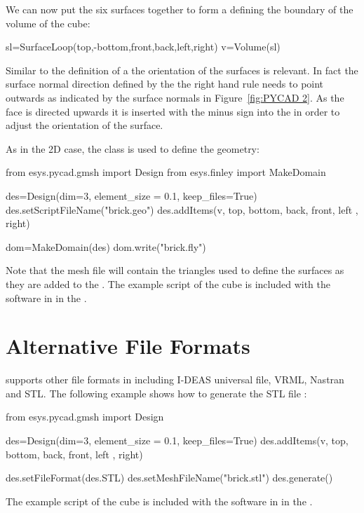 We can now put the six surfaces together to form a  defining the
boundary of the volume of the cube:
\begin{python}
sl=SurfaceLoop(top,-bottom,front,back,left,right)
v=Volume(sl)
\end{python}
Similar to the definition of a  the orientation of the surfaces  is relevant. In fact the surface normal direction defined by the the right hand rule needs to point outwards as indicated by the surface normals in
Figure~\ref{fig:PYCAD 2}. As the  face is directed upwards it is inserted with the minus sign 
into the  in order to adjust the orientation of the surface. 

As in the 2D case, the  class is used to define the geometry:
\begin{python}
from esys.pycad.gmsh import Design
from esys.finley import MakeDomain

des=Design(dim=3, element_size = 0.1, keep_files=True)
des.setScriptFileName("brick.geo")
des.addItems(v, top, bottom, back, front, left , right)

dom=MakeDomain(des)
dom.write("brick.fly")
\end{python}
Note that the \finley mesh file  will contain the 
triangles used to define the surfaces as they are added to the .
The example script of the cube is included with the software in
 in the \ExampleDirectory. 

\section{Alternative File Formats}
 supports other file formats in including 
I-DEAS universal file, VRML, Nastran and STL. The following example shows how
to generate the STL file :
\begin{python}
from esys.pycad.gmsh import Design

des=Design(dim=3, element_size = 0.1, keep_files=True)
des.addItems(v, top, bottom, back, front, left , right)

des.setFileFormat(des.STL)
des.setMeshFileName("brick.stl")
des.generate()
\end{python}
The example script of the cube is included with the software in
 in the \ExampleDirectory. 


